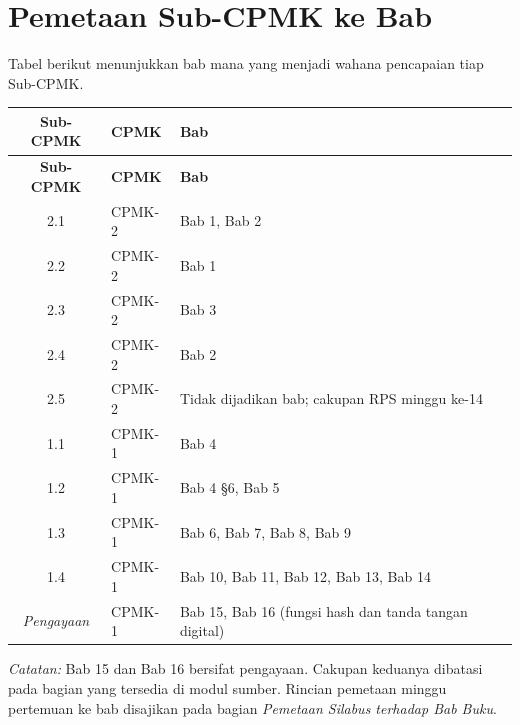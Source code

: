 \documentclass[../main.tex]{subfiles}
\begin{document}
\section*{Pemetaan Sub-CPMK ke Bab}

Tabel berikut menunjukkan bab mana yang menjadi wahana pencapaian tiap
Sub-CPMK.

\begin{longtable}{|c|>{\raggedright\arraybackslash}p{4.2cm}|>{\raggedright\arraybackslash}p{6.0cm}|}
\hline
\textbf{Sub-CPMK} & \textbf{CPMK} & \textbf{Bab} \\
\hline
\endfirsthead
\hline
\textbf{Sub-CPMK} & \textbf{CPMK} & \textbf{Bab} \\
\hline
\endhead
2.1 & CPMK-2 & Bab 1, Bab 2 \\
\hline
2.2 & CPMK-2 & Bab 1 \\
\hline
2.3 & CPMK-2 & Bab 3 \\
\hline
2.4 & CPMK-2 & Bab 2 \\
\hline
2.5 & CPMK-2 & Tidak dijadikan bab; cakupan RPS minggu ke-14 \\
\hline
1.1 & CPMK-1 & Bab 4 \\
\hline
1.2 & CPMK-1 & Bab 4 \S6, Bab 5 \\
\hline
1.3 & CPMK-1 & Bab 6, Bab 7, Bab 8, Bab 9 \\
\hline
1.4 & CPMK-1 & Bab 10, Bab 11, Bab 12, Bab 13, Bab 14 \\
\hline
\textit{Pengayaan} & CPMK-1 & Bab 15, Bab 16 (fungsi hash dan tanda tangan digital) \\
\hline
\end{longtable}

\textit{Catatan:} Bab 15 dan Bab 16 bersifat pengayaan. Cakupan keduanya
dibatasi pada bagian yang tersedia di modul sumber. Rincian pemetaan minggu
pertemuan ke bab disajikan pada bagian \emph{Pemetaan Silabus terhadap Bab Buku}.
\end{document}
